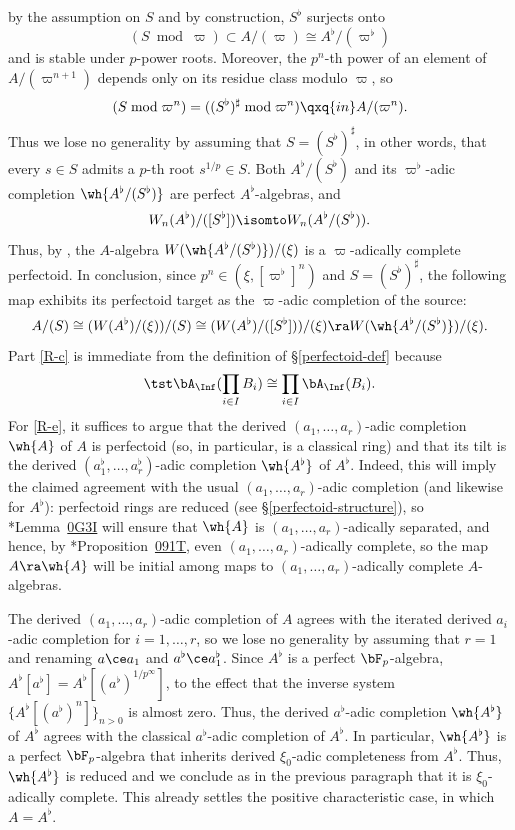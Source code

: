by the assumption on $S$ and by construction, $S^\flat$ surjects onto
\[
(S \bmod \varpi) \subset A/(\varpi) \cong A^\flat/(\varpi^\flat)
\]
and is stable under $p$-power roots. Moreover, the $p^n$-th power of an element of $A/(\varpi^{n + 1})$ depends only on its residue class modulo $\varpi$, so %
\[
(S \bmod \varpi^n) = ((S^\flat)^\sharp \bmod \varpi^n) \qxq{in} A/(\varpi^n).
\]
Thus we lose no generality by assuming that $S = (S^\flat)^\sharp$, in other words, that every $s \in S$ admits a $p$-th root $s^{1/p} \in S$. Both $A^\flat/(S^\flat)$ and its $\varpi^\flat$-adic completion $\wh{A^\flat/(S^\flat)}$ are perfect $A^\flat$-algebras, and
\[
W_n(A^\flat)/([S^\flat]) \isomto W_n(A^\flat/(S^\flat)).
\]
Thus, by , the $A$-algebra $W(\wh{A^\flat/(S^\flat)})/(\xi)$ is a $\varpi$-adically complete perfectoid. In conclusion, since $p^n \in (\xi, [\varpi^\flat]^n)$ and $S = (S^\flat)^\sharp$, the following map exhibits its perfectoid target as the $\varpi$-adic completion of the source:
\[%
\source{purity-flat-cohomology}
A/(S) \cong (W(A^\flat)/(\xi))/(S) \cong (W(A^\flat)/([S^\flat]))/(\xi)
\ra W(\wh{A^\flat/(S^\flat)})/(\xi).
\]%
Part \ref{R-c} is immediate from the definition of \S\ref{perfectoid-def} because
\[
\tst\bA_\Inf(\prod_{i \in I} B_i) \cong \prod_{i \in I} \bA_\Inf(B_i).
\]
For \ref{R-e}, it suffices to argue that the derived $(a_1, \dotsc, a_r)$-adic completion $\wh{A}$ of $A$ is perfectoid (so, in particular, is a classical ring) and that its tilt is the derived $(a_1^\flat, \dotsc, a_r^\flat)$-adic completion $\wh{A^\flat}$ of $A^\flat$. Indeed, this will imply the claimed agreement with the usual $(a_1, \dotsc, a_r)$-adic completion (and likewise for $A^\flat$): perfectoid rings are reduced (see \S\ref{perfectoid-structure}), so \cite{SP}*{Lemma~\href{https://stacks.math.columbia.edu/tag/0G3I}{0G3I}} will ensure that $\wh{A}$ is $(a_1, \dotsc, a_r)$-adically separated, and hence, by \cite{SP}*{Proposition~\href{https://stacks.math.columbia.edu/tag/091T}{091T}}, even $(a_1, \dotsc, a_r)$-adically complete, so the map $A \ra \wh{A}$ will be initial among maps to $(a_1, \dotsc, a_r)$-adically complete $A$-algebras.

The derived $(a_1, \dotsc, a_r)$-adic completion of $A$ agrees with the iterated derived $a_i$-adic completion for $i = 1, \dotsc, r$, so we lose no generality by assuming that $r = 1$ and renaming $a \ce a_1$ and $a^\flat \ce a_1^\flat$. Since $A^\flat$ is a perfect $\bF_p$-algebra, $A^\flat[a^\flat] = A^\flat[(a^\flat)^{1/p^\infty}]$, to the effect that the inverse system $\{ A^\flat[(a^\flat)^n]\}_{n > 0}$ is almost zero. Thus, the derived $a^\flat$-adic completion $\wh{A^\flat}$ of $A^\flat$ agrees with the classical $a^\flat$-adic completion of $A^\flat$. In particular, $\wh{A^\flat}$ is a perfect $\bF_p$-algebra that inherits derived $\xi_0$-adic completeness from $A^\flat$. Thus, $\wh{A^\flat}$ is reduced and we conclude as in the previous paragraph that it is $\xi_0$-adically complete. This already settles the positive characteristic case, in which $A = A^\flat$.


